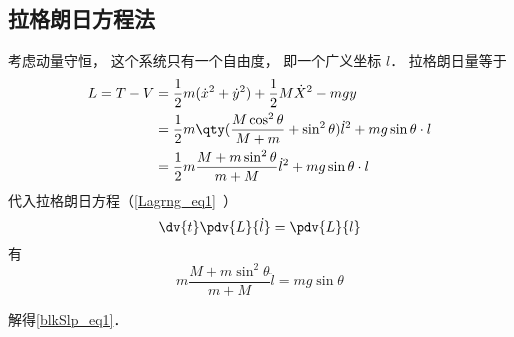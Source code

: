 \subsection{拉格朗日方程法}
考虑动量守恒， 这个系统只有一个自由度， 即一个广义坐标 $l$． 拉格朗日量等于
\begin{equation}
\begin{aligned}
L = T - V &= \frac12 m(\dot x^2 + \dot y^2) + \frac12 M \dot X^2 - mgy\\
&= \frac{1}{2}m \qty( \frac{M\cos^2\theta}{M + m}+\sin^2\theta) \dot l^2 + mg\sin\theta \cdot l\\
&=\frac{1}{2}m\frac{M+m\sin^2\theta}{m+M}\dot{l}^2+mg\sin\theta\cdot l
\end{aligned}
\end{equation}
代入拉格朗日方程（\autoref{Lagrng_eq1}~）
\begin{equation}
\dv{t} \pdv{L}{\dot l} = \pdv{L}{l}
\end{equation}
有
\begin{equation}
m\frac{M+m\sin^2\theta}{m+M}\ddot{l}=mg\sin\theta
\end{equation}

解得\autoref{blkSlp_eq1}．
